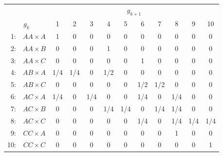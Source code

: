 \begin{center}
\begin{tabular}{rc@{\hspace{10mm}}cccccccccc} \hline
 && \multicolumn{10}{c}{$g_{k+1}$} \\ \cline{3-12}
\multicolumn{2}{c}{$g_k$}  & 1 & 2 & 3 & 4 & 5 & 6 & 7 & 8 & 9 & 10\\ \hline
1: & $AA \times A$ & 1 & 0 & 0 & 0 & 0 & 0 & 0 & 0 & 0 & 0 \\ 
2: & $AA \times B$ & 0 & 0 & 0 & 1 & 0 & 0 & 0 & 0 & 0 & 0 \\ 
3: & $AA \times C$ & 0 & 0 & 0 & 0 & 0 & 1 & 0 & 0 & 0 & 0 \\ 
4: & $AB \times A$ & 1/4 & 1/4 & 0 & 1/2 & 0 & 0 & 0 & 0 & 0 & 0 \\ 
5: & $AB \times C$ & 0 & 0 & 0 & 0 & 0 & 1/2 & 1/2 & 0 & 0 & 0 \\ 
6: & $AC \times A$ & 1/4 & 0 & 1/4 & 0 & 0 & 1/4 & 0 & 1/4 & 0 & 0 \\ 
7: & $AC \times B$ & 0 & 0 & 0 & 1/4 & 1/4 & 0 & 1/4 & 1/4 & 0 & 0 \\ 
8: & $AC \times C$ & 0 & 0 & 0 & 0 & 0 & 1/4 & 0 & 1/4 & 1/4 & 1/4 \\ 
9: & $CC \times A$ & 0 & 0 & 0 & 0 & 0 & 0 & 0 & 1 & 0 & 0 \\ 
10: & $CC \times C$ & 0 & 0 & 0 & 0 & 0 & 0 & 0 & 0 & 0 & 1 \\ 
\hline
\end{tabular}
\end{center}

